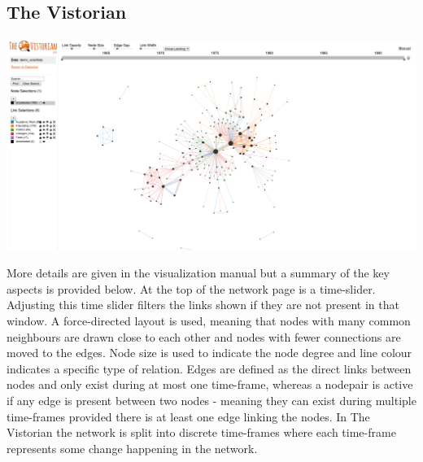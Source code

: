 \subsection{The Vistorian}

\begin{center}
\includegraphics[trim={0 0 0 0}, width=140mm]{./Figures/vistorianOriginal.png}
\end{center}

More details are given in the visualization manual \cite{vismanual} but a summary of the key aspects is provided below.
At the top of the network page is a time-slider. Adjusting this time slider filters the links shown if they are not present in that window. A force-directed layout is used, meaning that nodes with many common neighbours are drawn close to each other and nodes with fewer connections are moved to the edges. Node size is used to indicate the node degree and line colour indicates a specific type of relation. Edges are defined as the direct links between nodes and only exist during at most one time-frame, whereas a nodepair is active if any edge is present between two nodes - meaning they can exist during multiple time-frames provided there is at least one edge linking the nodes. In The Vistorian the network is split into discrete time-frames where each time-frame represents some change happening in the network. 





